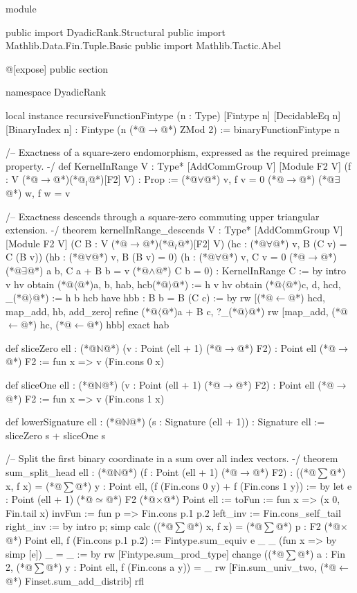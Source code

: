 module

public import DyadicRank.Structural
public import Mathlib.Data.Fin.Tuple.Basic
public import Mathlib.Tactic.Abel

@[expose] public section

namespace DyadicRank

local instance recursiveFunctionFintype (n : Type) [Fintype n] [DecidableEq n] [BinaryIndex n] :
    Fintype (n (*@$\to$@*) ZMod 2) := binaryFunctionFintype n

/-- Exactness of a square-zero endomorphism, expressed as the required preimage property. -/
def KernelInRange {V : Type*} [AddCommGroup V] [Module F2 V] (f : V (*@$\to$@*)(*@${}_l$@*)[F2] V) : Prop :=
  (*@$\forall$@*) v, f v = 0 (*@$\to$@*) (*@$\exists$@*) w, f w = v

/-- Exactness descends through a square-zero commuting upper triangular extension. -/
theorem kernelInRange_descends {V : Type*} [AddCommGroup V] [Module F2 V]
    (C B : V (*@$\to$@*)(*@${}_l$@*)[F2] V) (hc : (*@$\forall$@*) v, B (C v) = C (B v)) (hb : (*@$\forall$@*) v, B (B v) = 0)
    (h : (*@$\forall$@*) v, C v = 0 (*@$\to$@*) (*@$\exists$@*) a b, C a + B b = v (*@$\land$@*) C b = 0) : KernelInRange C := by
  intro v hv
  obtain (*@$\langle$@*)a, b, hab, hcb(*@$\rangle$@*) := h v hv
  obtain (*@$\langle$@*)c, d, hcd, _(*@$\rangle$@*) := h b hcb
  have hbb : B b = B (C c) := by
    rw [(*@$\leftarrow$@*) hcd, map_add, hb, add_zero]
  refine (*@$\langle$@*)a + B c, ?_(*@$\rangle$@*)
  rw [map_add, (*@$\leftarrow$@*) hc, (*@$\leftarrow$@*) hbb]
  exact hab

def sliceZero {ell : (*@$\mathbb{N}$@*)} (v : Point (ell + 1) (*@$\to$@*) F2) : Point ell (*@$\to$@*) F2 :=
  fun x => v (Fin.cons 0 x)

def sliceOne {ell : (*@$\mathbb{N}$@*)} (v : Point (ell + 1) (*@$\to$@*) F2) : Point ell (*@$\to$@*) F2 :=
  fun x => v (Fin.cons 1 x)

def lowerSignature {ell : (*@$\mathbb{N}$@*)} (s : Signature (ell + 1)) : Signature ell :=
  sliceZero s + sliceOne s

/-- Split the first binary coordinate in a sum over all index vectors. -/
theorem sum_split_head {ell : (*@$\mathbb{N}$@*)} (f : Point (ell + 1) (*@$\to$@*) F2) :
    ((*@$\sum$@*) x, f x) = (*@$\sum$@*) y : Point ell, (f (Fin.cons 0 y) + f (Fin.cons 1 y)) := by
  let e : Point (ell + 1) (*@$\simeq$@*) F2 (*@$\times$@*) Point ell :=
    { toFun := fun x => (x 0, Fin.tail x)
      invFun := fun p => Fin.cons p.1 p.2
      left_inv := Fin.cons_self_tail
      right_inv := by intro p; simp }
  calc
    ((*@$\sum$@*) x, f x) = (*@$\sum$@*) p : F2 (*@$\times$@*) Point ell, f (Fin.cons p.1 p.2) :=
      Fintype.sum_equiv e _ _ (fun x => by simp [e])
    _ = _ := by
      rw [Fintype.sum_prod_type]
      change ((*@$\sum$@*) a : Fin 2, (*@$\sum$@*) y : Point ell, f (Fin.cons a y)) = _
      rw [Fin.sum_univ_two, (*@$\leftarrow$@*) Finset.sum_add_distrib]
      rfl

